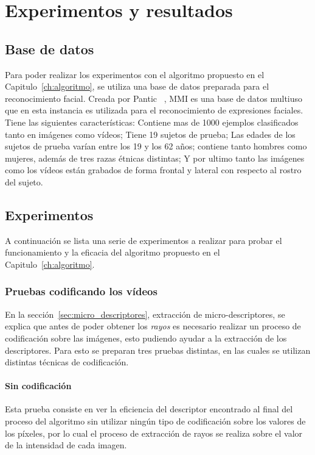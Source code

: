 \chapter[Experimentos y resultados]{Experimentos y resultados}
\label{ch:exp_result}

\section{Base de datos}
\label{exp:bdd}
Para poder realizar los experimentos con el algoritmo propuesto en el Capitulo~\ref{ch:algoritmo}, se utiliza una base de datos preparada para el reconocimiento facial. Creada por Pantic \etal~\cite{Pantic2005}, MMI es una base de datos multiuso que en esta instancia es utilizada para el reconocimiento de expresiones faciales. Tiene las siguientes características: Contiene mas de 1000 ejemplos clasificados tanto en imágenes como vídeos; Tiene 19 sujetos de prueba; Las edades de los sujetos de prueba varían entre los 19 y los 62 años;  contiene tanto hombres como mujeres, además de tres razas étnicas distintas; Y por ultimo tanto las imágenes como los vídeos están grabados de forma frontal y lateral con respecto al rostro del sujeto.


\section{Experimentos}
A continuación se lista una serie de experimentos a realizar para probar el funcionamiento y la eficacia del algoritmo propuesto en el Capitulo~\ref{ch:algoritmo}.

\subsection{Pruebas codificando los vídeos}
\label{exp:cod}
En la sección~\ref{sec:micro_descriptores}, extracción de micro-descriptores, se explica que antes de poder obtener los \textit{rayos} es necesario realizar un proceso de codificación sobre las imágenes, esto pudiendo ayudar a la extracción de los descriptores. Para esto se preparan tres pruebas distintas, en las cuales se utilizan distintas técnicas de codificación.

	\subsubsection{Sin codificación}
	Esta prueba consiste en ver la eficiencia del descriptor encontrado al final del proceso del algoritmo sin utilizar ningún tipo de codificación sobre los valores de los píxeles, por lo cual el proceso de extracción de rayos se realiza sobre el valor de la intensidad de cada imagen.

